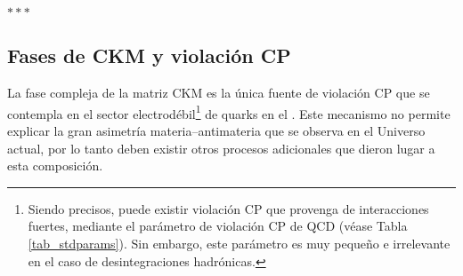 
\bigskip

\begin{center}
	$***$
\end{center}

\medskip


\begin{subappendices}





\section{Fases de CKM y violación CP}  %
\label{ap_cpvio}

La fase compleja de la matriz CKM es la única fuente de violación CP que se contempla en el sector electrodébil\footnote{Siendo precisos, puede existir violación CP que provenga de interacciones fuertes, mediante el parámetro de violación CP de QCD (véase Tabla \ref{tab_stdparams}). Sin embargo, este parámetro es muy pequeño e irrelevante en el caso de desintegraciones hadrónicas.} de quarks en el \stdmod. Este mecanismo no permite explicar la gran asimetría materia--antimateria que se observa en el Universo actual, por lo tanto deben existir otros procesos adicionales que dieron lugar a esta composición.


\end{subappendices}

